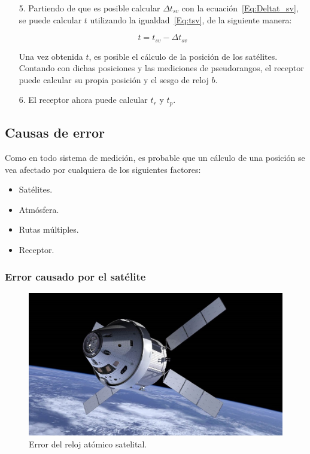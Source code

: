 {\begin{itemize}
y $\Delta n$ es una constante dada por la observación.\\

\item[5.] Partiendo de que es posible calcular $\Delta t_{sv}$ con la ecuación~\ref{Eq:Deltat_sv}, se puede calcular $t$ utilizando la igualdad~\ref{Eq:tsv}, de la siguiente manera:

\begin{equation}
\label{t}
t = t_{sv} - \Delta t_{sv}
\end{equation}

Una vez obtenida $t$, es posible el cálculo de la posición de los satélites. Contando con dichas posiciones y las mediciones de pseudorangos, el receptor puede calcular su propia posición y el sesgo de reloj $b$.

\item[6.] El receptor ahora puede calcular $t_r$ y $t_p$.
\end{itemize}
}
\subsection{Causas de error}\label{subsec:CauErr}

Como en todo sistema de medición, es probable que un cálculo de una posición se vea afectado por cualquiera de los siguientes factores: 

\begin{itemize}
	\item Satélites.
	\item Atmósfera.
	\item Rutas múltiples.
	\item Receptor.
\end{itemize} 

\subsubsection{Error causado por el satélite}

\begin{figure}[H]
\centering
\includegraphics[scale=0.41]{Figures/Sat}
\caption[Error del reloj atómico satelital.]{Error del reloj atómico satelital\footnotemark.}
\label{fig:ErrSat}
\end{figure}

